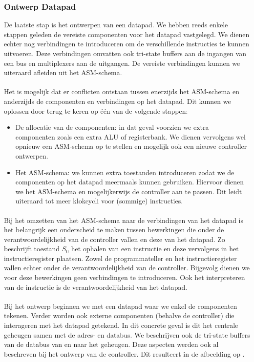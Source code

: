 \subsubsection{Ontwerp Datapad}
De laatste stap is het ontwerpen van een datapad. We hebben reeds enkele stappen geleden de vereiste componenten voor het datapad vastgelegd. We dienen echter nog verbindingen te introduceren om de verschillende instructies te kunnen uitvoeren. Deze verbindingen omvatten ook tri-state buffers aan de ingangen van een bus en multiplexers aan de uitgangen. De vereiste verbindingen kunnen we uiteraard afleiden uit het ASM-schema.
\paragraph{}
Het is mogelijk dat er conflicten ontstaan tussen enerzijds het ASM-schema en anderzijds de componenten en verbindingen op het datapad. Dit kunnen we oplossen door terug te keren op \'e\'en van de volgende stappen:
\begin{itemize}
 \item De allocatie van de componenten: in dat geval voorzien we extra componenten zoals een extra ALU of registerbank. We dienen vervolgens wel opnieuw een ASM-schema op te stellen en mogelijk ook een nieuwe controller ontwerpen.
 \item Het ASM-schema: we kunnen extra toestanden introduceren zodat we de componenten op het datapad meermaals kunnen gebruiken. Hiervoor dienen we het ASM-schema en mogelijkerwijs de controller aan te passen. Dit leidt uiteraard tot meer klokcycli voor (sommige) instructies.
\end{itemize}
\paragraph{}
Bij het omzetten van het ASM-schema naar de verbindingen van het datapad is het belangrijk een onderscheid te maken tussen bewerkingen die onder de verantwoordelijkheid van de controller vallen en deze van het datapad. Zo beschrijft toestand $S_0$ het ophalen van een instructie en deze vervolgens in het instructieregister plaatsen. Zowel de programmateller en het instructieregister vallen echter onder de verantwoordelijkheid van de controller. Bijgevolg dienen we voor deze bewerkingen geen verbindingen te introduceren. Ook het interpreteren van de instructie is de verantwoordelijkheid van het datapad.
\paragraph{}
Bij het ontwerp beginnen we met een datapad waar we enkel de componenten tekenen. Verder worden ook externe componenten (behalve de controller) die interageren met het datapad getekend. In dit concrete geval is dit het centrale geheugen samen met de adres- en databus. We beschrijven ook de tri-state buffers van de databus van en naar het geheugen. Deze aspecten werden ook al beschreven bij het ontwerp van de controller. Dit resulteert in de afbeelding op .
